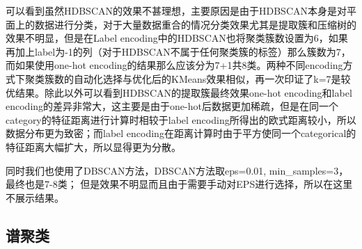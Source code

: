 \newpage
可以看到虽然HDBSCAN的效果不甚理想，主要原因是由于HDBSCAN本身是对平面上的数据进行分类，对于大量数据重合的情况分类效果尤其是提取簇和压缩树的效果不明显，但是在Label encoding中的HDBSCAN也将聚类簇数设置为6，如果再加上label为-1的列（对于HDBSCAN不属于任何聚类簇的标签）那么簇数为7，而如果使用one-hot encoding的结果那么应该分为7+1共8类。两种不同encoding方式下聚类簇数的自动化选择与优化后的KMeans效果相似，再一次印证了k=7是较优结果。除此以外可以看到HDBSCAN的提取簇最终效果one-hot encoding和label encoding的差异非常大，这主要是由于one-hot后数据更加稀疏，但是在同一个category的特征距离进行计算时相较于label encoding所得出的欧式距离较小，所以数据分布更为致密；而label encoding在距离计算时由于平方使同一个categorical的特征距离大幅扩大，所以显得更为分散。

同时我们也使用了DBSCAN方法，DBSCAN方法取eps=0.01, min\_samples=3，最终也是7-8类；
但是效果不明显而且由于需要手动对EPS进行选择，所以在这里不展示结果。

\subsection{谱聚类}


